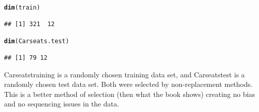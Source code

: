 \documentclass{article}\usepackage[]{graphicx}\usepackage[]{color}
\makeatletter
\newcommand{\hlstd}[1]{\textcolor[rgb]{0.345,0.345,0.345}{#1}}%
\newcommand{\hlkwd}[1]{\textcolor[rgb]{0.737,0.353,0.396}{\textbf{#1}}}%
\newenvironment{kframe}{%
 \def\at@end@of@kframe{}%
 \ifinner\ifhmode%
  \def\at@end@of@kframe{\end{minipage}}%
  \begin{minipage}{\columnwidth}%
 \fi\fi%
 \def\FrameCommand##1{\hskip\@totalleftmargin \hskip-\fboxsep
 \colorbox{shadecolor}{##1}\hskip-\fboxsep
     \hskip-\linewidth \hskip-\@totalleftmargin \hskip\columnwidth}%
 \MakeFramed {\advance\hsize-\width
   \@totalleftmargin\z@ \linewidth\hsize
   \@setminipage}}%
 {\par\unskip\endMakeFramed%
 \at@end@of@kframe}
\newenvironment{knitrout}{}{} %
\makeatother
\begin{document}
\begin{enumerate}[(a)]
\begin{knitrout}
\begin{kframe}
\begin{alltt}
\hlkwd{dim}\hlstd{(train)}
\end{alltt}
\begin{verbatim}
## [1] 321  12
\end{verbatim}
\begin{alltt}
\hlkwd{dim}\hlstd{(Carseats.test)}
\end{alltt}
\begin{verbatim}
## [1] 79 12
\end{verbatim}
\end{kframe}
\end{knitrout}
Carseatstraining is a randomly chosen training data set, and Carseatstest is a randomly chosen test data set. Both were selected by non-replacement methods. This is a better method of selection (then what the book shows) creating no bias and no sequencing issues in the data.


\end{enumerate}
\end{document}
